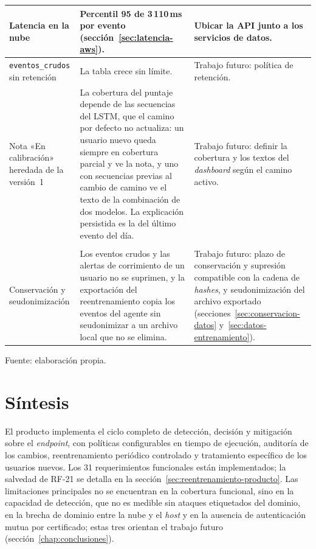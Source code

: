 \begin{longtable}{>{\raggedright\arraybackslash}p{4.4cm}>{\raggedright\arraybackslash}p{5.0cm}>{\raggedright\arraybackslash}p{4.7cm}}
	\hline
	Latencia en la nube & Percentil 95 de 3\,110\,ms por evento (sección~\ref{sec:latencia-aws}). & Ubicar la API junto a los servicios de datos. \\
	\hline
	\texttt{eventos\_\allowbreak{}crudos} sin retención & La tabla crece sin límite. & Trabajo futuro: política de retención. \\
	\hline
	Nota «En calibración» heredada de la versión~1 & La cobertura del puntaje depende de las secuencias del LSTM, que el camino por defecto no actualiza: un usuario nuevo queda siempre en cobertura parcial y ve la nota, y uno con secuencias previas al cambio de camino ve el texto de la combinación de dos modelos. La explicación persistida es la del último evento del día. & Trabajo futuro: definir la cobertura y los textos del \emph{dashboard} según el camino activo. \\
	\hline
	\multicolumn{3}{l}{\textit{Datos personales}} \\
	\hline
	Conservación y seudonimización & Los eventos crudos y las alertas de corrimiento de un usuario no se suprimen, y la exportación del reentrenamiento copia los eventos del agente sin seudonimizar a un archivo local que no se elimina. & Trabajo futuro: plazo de conservación y supresión compatible con la cadena de \emph{hashes}, y seudonimización del archivo exportado (secciones~\ref{sec:conservacion-datos} y~\ref{sec:datos-entrenamiento}). \\
	\hline
\end{longtable}
{\small Fuente: elaboración propia.\par}

\section{Síntesis}
\label{sec:sintesis-producto}
El producto implementa el ciclo completo de detección, decisión y mitigación sobre el \emph{endpoint}, con políticas configurables en tiempo de ejecución, auditoría de los cambios, reentrenamiento periódico controlado y tratamiento específico de los usuarios nuevos. Los 31 requerimientos funcionales están implementados; la salvedad de RF-21 se detalla en la sección~\ref{sec:reentrenamiento-producto}. Las limitaciones principales no se encuentran en la cobertura funcional, sino en la capacidad de detección, que no es medible sin ataques etiquetados del dominio, en la brecha de dominio entre la nube y el \emph{host} y en la ausencia de autenticación mutua por certificado; estas tres orientan el trabajo futuro (sección~\ref{chap:conclusiones}).

